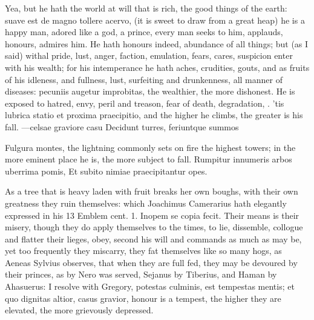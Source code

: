 {Yea, but he hath the world at will that is rich, the good things of the
earth: suave est de magno tollere acervo, (it is sweet to draw from a
great heap) he is a happy man, adored like a god, a prince, every
man seeks to him, applauds, honours, admires him. He hath honours
indeed, abundance of all things; but (as I said) withal pride,
lust, anger, faction, emulation, fears, cares, suspicion enter with his
wealth; for his intemperance he hath aches, crudities, gouts, and as
fruits of his idleness, and fullness, lust, surfeiting and drunkenness,
all manner of diseases: pecuniis augetur improbitas, the wealthier, the
more dishonest. He is exposed to hatred, envy, peril and treason,
fear of death, degradation, \etc{}. 'tis lubrica statio et proxima
praecipitio, and the higher he climbs, the greater is his fall.
---celsae graviore casu
Decidunt turres, feriuntque summos

Fulgura montes, the lightning commonly sets on fire the highest towers;
in the more eminent place he is, the more subject to fall.
Rumpitur innumeris arbos uberrima pomis,
Et subito nimiae praecipitantur opes.

As a tree that is heavy laden with fruit breaks her own boughs, with
their own greatness they ruin themselves: which Joachimus Camerarius
hath elegantly expressed in his 13 Emblem cent. 1. Inopem se copia
fecit. Their means is their misery, though they do apply themselves to
the times, to lie, dissemble, collogue and flatter their lieges, obey,
second his will and commands as much as may be, yet too frequently they
miscarry, they fat themselves like so many hogs, as Aeneas
Sylvius observes, that when they are full fed, they may be devoured by
their princes, as \Seneca by Nero was served, Sejanus by Tiberius, and
Haman by Ahasuerus: I resolve with Gregory, potestas culminis, est
tempestas mentis; et quo dignitas altior, casus gravior, honour is a
tempest, the higher they are elevated, the more grievously depressed.

}
